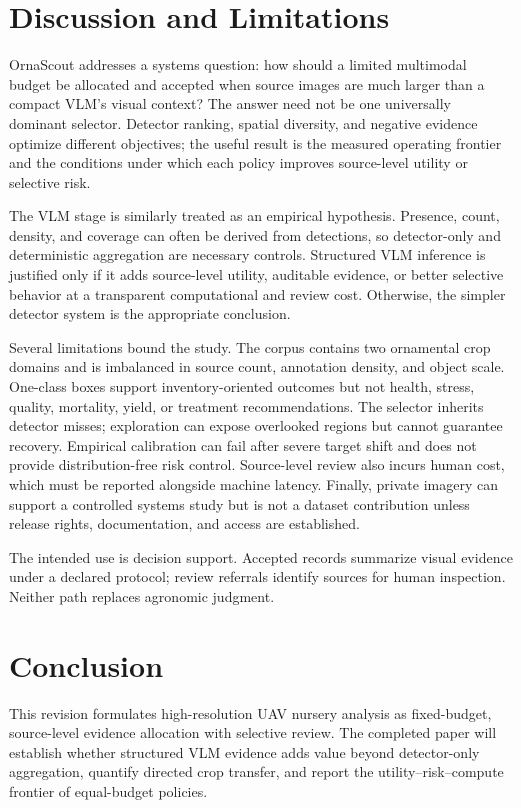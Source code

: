\section{Discussion and Limitations}
OrnaScout addresses a systems question: how should a limited multimodal budget be allocated and accepted when source images are much larger than a compact VLM's visual context? The answer need not be one universally dominant selector. Detector ranking, spatial diversity, and negative evidence optimize different objectives; the useful result is the measured operating frontier and the conditions under which each policy improves source-level utility or selective risk.

The VLM stage is similarly treated as an empirical hypothesis. Presence, count, density, and coverage can often be derived from detections, so detector-only and deterministic aggregation are necessary controls. Structured VLM inference is justified only if it adds source-level utility, auditable evidence, or better selective behavior at a transparent computational and review cost. Otherwise, the simpler detector system is the appropriate conclusion.

Several limitations bound the study. The corpus contains two ornamental crop domains and is imbalanced in source count, annotation density, and object scale. One-class boxes support inventory-oriented outcomes but not health, stress, quality, mortality, yield, or treatment recommendations. The selector inherits detector misses; exploration can expose overlooked regions but cannot guarantee recovery. Empirical calibration can fail after severe target shift and does not provide distribution-free risk control. Source-level review also incurs human cost, which must be reported alongside machine latency. Finally, private imagery can support a controlled systems study but is not a dataset contribution unless release rights, documentation, and access are established.

The intended use is decision support. Accepted records summarize visual evidence under a declared protocol; review referrals identify sources for human inspection. Neither path replaces agronomic judgment.

\section{Conclusion}
This revision formulates high-resolution UAV nursery analysis as fixed-budget, source-level evidence allocation with selective review. The completed paper will establish whether structured VLM evidence adds value beyond detector-only aggregation, quantify directed crop transfer, and report the utility--risk--compute frontier of equal-budget policies. 
